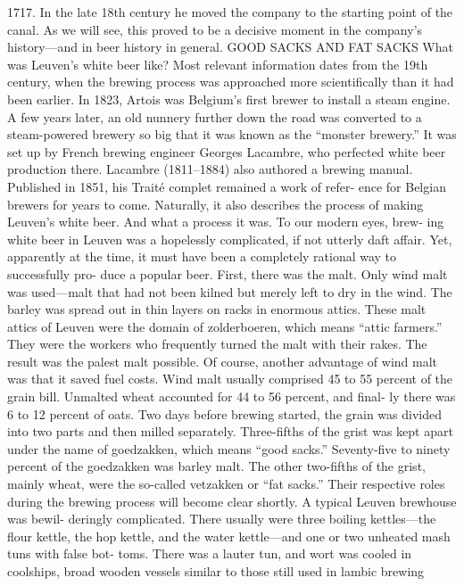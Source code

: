 \documentclass[a4paper,parskip=half]{scrartcl}
\begin{document}
\parencite[47]{Mulder2020}
1717. In the late 18th century he moved the
company to the starting point of the canal.
As we will see, this proved to be a decisive
moment in the company’s history—and in
beer history in general.
GOOD SACKS AND FAT SACKS
What was Leuven’s white beer like? Most
relevant information dates from the 19th
century, when the brewing process was
approached more scientifically than it had
been earlier. In 1823, Artois was Belgium’s
first brewer to install a steam engine. A few
years later, an old nunnery further down
the road was converted to a steam-powered
brewery so big that it was known as the
“monster brewery.” It was set up by French
brewing engineer Georges Lacambre, who
perfected white beer production there.
Lacambre (1811–1884) also authored a
brewing manual. Published in 1851, his
Traité complet remained a work of refer-
ence for Belgian brewers for years to come.
Naturally, it also describes the process of
making Leuven’s white beer. And what a
process it was. To our modern eyes, brew-
ing white beer in Leuven was a hopelessly
complicated, if not utterly daft affair. Yet,
apparently at the time, it must have been a
completely rational way to successfully pro-
duce a popular beer.
First, there was the malt. Only wind
malt was used—malt that had not been
kilned but merely left to dry in the wind.
The barley was spread out in thin layers on
racks in enormous attics. These malt attics
of Leuven were the domain of zolderboeren,
which means “attic farmers.” They were the
workers who frequently turned the malt
with their rakes. The result was the palest
malt possible. Of course, another advantage
of wind malt was that it saved fuel costs.
Wind malt usually comprised 45 to 55
percent of the grain bill. Unmalted wheat
accounted for 44 to 56 percent, and final-
ly there was 6 to 12 percent of oats. Two
days before brewing started, the grain was
divided into two parts and then milled
separately. Three-fifths of the grist was kept
apart under the name of goedzakken, which
means “good sacks.” Seventy-five to ninety
percent of the goedzakken was barley malt.
The other two-fifths of the grist, mainly
wheat, were the so-called vetzakken or “fat
sacks.” Their respective roles during the
brewing process will become clear shortly.
A typical Leuven brewhouse was bewil-
deringly complicated. There usually were
three boiling kettles—the flour kettle, the
hop kettle, and the water kettle—and one
or two unheated mash tuns with false bot-
toms. There was a lauter tun, and wort was
cooled in coolships, broad wooden vessels
similar to those still used in lambic brewing
\end{document}
